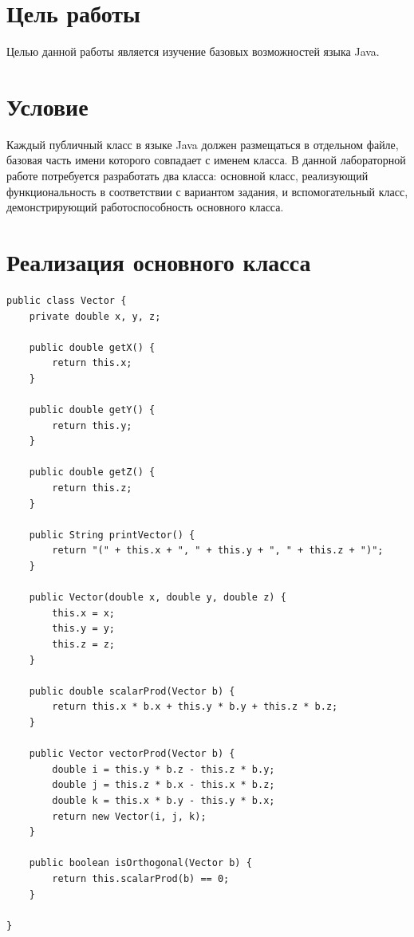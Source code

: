 \documentclass[a4paper, 14pt]{extarticle}
\begin{document}
\newpage
\section{Цель работы}
Целью данной работы является изучение базовых возможностей языка Java. 

\section{Условие}
Каждый публичный класс в языке Java должен размещаться в отдельном файле, базовая
часть имени которого совпадает с именем класса. В данной лабораторной работе потребуется
разработать два класса: основной класс, реализующий функциональность в соответствии с
вариантом задания, и вспомогательный класс, демонстрирующий работоспособность
основного класса. 

\section{Реализация основного класса}
{\small 
\begin{verbatim}
public class Vector {
    private double x, y, z;

    public double getX() {
        return this.x;
    }

    public double getY() {
        return this.y;
    }

    public double getZ() {
        return this.z;
    }

    public String printVector() {
        return "(" + this.x + ", " + this.y + ", " + this.z + ")";
    }

    public Vector(double x, double y, double z) {
        this.x = x;
        this.y = y;
        this.z = z;
    }

    public double scalarProd(Vector b) {
        return this.x * b.x + this.y * b.y + this.z * b.z;
    }

    public Vector vectorProd(Vector b) {
        double i = this.y * b.z - this.z * b.y;
        double j = this.z * b.x - this.x * b.z;
        double k = this.x * b.y - this.y * b.x;
        return new Vector(i, j, k);
    }

    public boolean isOrthogonal(Vector b) {
        return this.scalarProd(b) == 0;
    }

}
\end{verbatim}
}
\end{document}
